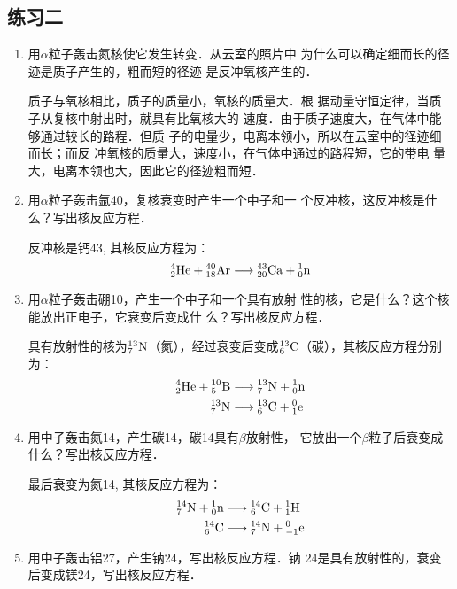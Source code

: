 \subsection{练习二}

\begin{enumerate}
    \item 用$\alpha$粒子轰击氮核使它发生转变．从云室的照片中
    为什么可以确定细而长的径迹是质子产生的，粗而短的径迹
    是反冲氧核产生的．


    \begin{solution}
    质子与氧核相比，质子的质量小，氧核的质量大．根
据动量守恒定律，当质子从复核中射出时，就具有比氧核大的
速度．由于质子速度大，在气体中能够通过较长的路程．但质
子的电量少，电离本领小，所以在云室中的径迹细而长；而反
冲氧核的质量大，速度小，在气体中通过的路程短，它的带电
量大，电离本领也大，因此它的径迹粗而短．
    \end{solution}
    \item 用$\alpha$粒子轰击氩40，复核衰变时产生一个中子和一
    个反冲核，这反冲核是什么？写出核反应方程．


    \begin{solution}
        反冲核是钙43, 其核反应方程为：
    \[\atom{He}{4}{2}+\atom{Ar}{40}{18}\longrightarrow \atom{Ca}{43}{20}+\atom{n}{1}{0}\]
    \end{solution}
    \item 用$\alpha$粒子轰击硼10，产生一个中子和一个具有放射
    性的核，它是什么？这个核能放出正电子，它衰变后变成什
    么？写出核反应方程．


    \begin{solution}
        具有放射性的核为$\atom{N}{13}{7}$（氮），经过衰变后变成$\atom{C}{13}{6}$（碳），其核反应方程分别为：
\[\begin{split}
    \atom{He}{4}{2}+\atom{B}{10}{5}&\longrightarrow \atom{N}{13}{7}+\atom{n}{1}{0}\\
    \atom{N}{13}{7} &\longrightarrow \atom{C}{13}{6}+\atom{e}{0}{1}
\end{split}\]
    \end{solution}
    \item 用中子轰击氮14，产生碳14，碳14具有$\beta$放射性，
    它放出一个$\beta$粒子后衰变成什么？写出核反应方程．


    \begin{solution}
        最后衰变为氮14, 其核反应方程为：
\[\begin{split}
    \atom{N}{14}{7}+\atom{n}{1}{0}&\longrightarrow \atom{C}{14}{6}+\atom{H}{1}{1}\\
    \atom{C}{14}{6} &\longrightarrow \atom{N}{14}{7}+\atom{e}{0}{-1}
\end{split}\]    
    \end{solution}
    \item 用中子轰击铝27，产生钠24，写出核反应方程．钠
    24是具有放射性的，衰变后变成镁24，写出核反应方程．



\end{enumerate}
